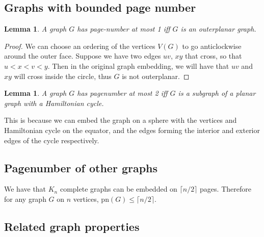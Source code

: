 \documentclass[]{article}
\newcommand{\pn}{\text{pn}}
\newtheorem{lemma}[theorem]{Lemma}
\theoremstyle{definition}
\numberwithin{theorem}{section}
\numberwithin{equation}{section}
\begin{document}
\subsection{Graphs with bounded page number}\label{ssec:Bounded_Pagenumber}
\begin{lemma}\label{lem:Pagenumber_1}
	A graph $G$ has page-number at most 1 iff $G$ is an outerplanar graph.
\end{lemma}
\begin{proof}
	We can choose an ordering of the vertices $V(G)$ to go anticlockwise around the outer face. Suppose we have two edges $uv$, $xy$ that cross, so that $u < x < v < y$. Then in the original graph embedding, we will have that $uv$ and $xy$ will cross inside the circle, thus $G$ is not outerplanar. 
\end{proof}
\begin{lemma}\label{lem:Pagenumber_2}
	A graph $G$ has pagenumber at most 2 iff $G$ is a subgraph of a planar graph with a Hamiltonian cycle.
\end{lemma}
This is because we can embed the graph on a sphere with the vertices and Hamiltonian cycle on the equator, and the edges forming the interior and exterior edges of the cycle respectively.

\subsection{Pagenumber of other graphs}\label{ssec:Pagenumber_Graphs}
We have that $K_n$ complete graphs can be embedded on $\lceil n/2 \rceil$ pages\cite{bernhartBookThicknessGraph1979}. Therefore for any graph $G$ on $n$ vertices, $\pn(G) \leq \lceil n/2 \rceil$. 

\subsection{Related graph properties}\label{ssec:Related_Properties}
\end{document}
